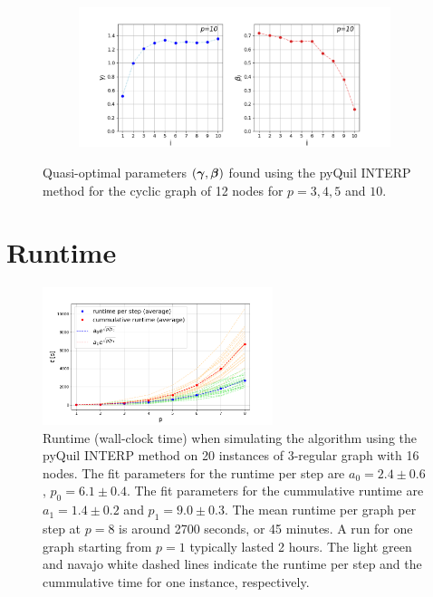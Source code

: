 \begin{figure}[H]
\begin{subfigure}[t]{0.7\textwidth}
	\end{subfigure}
	\\
	\centering
	\begin{subfigure}[t]{0.7\textwidth}
		\centering
		\includegraphics[width=\textwidth]{figures/interp/patterns/pattern_12-nodal_cyclic_p-10.png}
	\end{subfigure}
	\caption{Quasi-optimal parameters $(\bm{\gamma},\bm{\beta})$ found using the pyQuil INTERP method for the cyclic graph of 12 nodes for $p=3,4,5$ and $10$.}
	\label{fig:appendix-patterns-12-nodal-cyclic}
\end{figure}

\chapter{Runtime}
\label{appendix:runtime}
\begin{figure}[H]
	\centering
	\includegraphics[width=0.6\textwidth]{figures/interp/runtime_16-nodal.png}
	\caption{Runtime (wall-clock time) when simulating the algorithm using the pyQuil INTERP method on 20 instances of 3-regular graph with 16 nodes. The fit parameters for the runtime per step are $a_0 = 2.4 \pm 0.6$, $p_0 = 6.1 \pm 0.4$. The fit parameters for the cummulative runtime are $a_1 = 1.4\pm 0.2$ and $p_1 = 9.0\pm0.3$. The mean runtime per graph per step at $p=8$ is around 2700 seconds, or 45 minutes. A run for one graph starting from $p=1$ typically lasted 2 hours. The light green and navajo white dashed lines indicate the runtime per step and the cummulative time for one instance, respectively.}
\end{figure}

